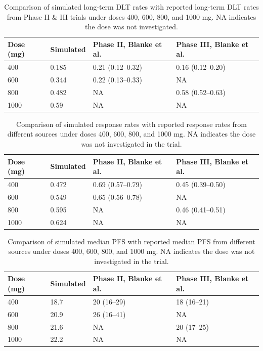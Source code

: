 \documentclass[11pt]{article}
\begin{document}
\begin{table}[htbp]
\centering
\caption{Comparison of simulated long-term DLT rates with reported long-term DLT rates from Phase II \& III trials under doses 400, 600, 800, and 1000 mg. NA indicates the dose was not investigated.}
\label{Imatinib_LT_DLT_comparison}
\begin{tabular}{llll}
\toprule
\textbf{Dose (mg)} & \textbf{Simulated} & \textbf{Phase II, Blanke et al.} & \textbf{Phase III, Blanke et al.} \\
\midrule
400  & 0.185 & 0.21 (0.12--0.32) & 0.16 (0.12--0.20) \\
600  & 0.344 & 0.22 (0.13--0.33) & NA \\
800  & 0.482 & NA & 0.58 (0.52--0.63) \\
1000 & 0.59  & NA & NA \\
\bottomrule
\end{tabular}
\end{table}

\begin{table}[htbp]
\centering
\caption{Comparison of simulated response rates with reported response rates from different sources under doses 400, 600, 800, and 1000 mg. NA indicates the dose was not investigated in the trial.}
\label{Imatinib_TRR_comparison}
\begin{tabular}{llll}
\toprule
\textbf{Dose (mg)} & \textbf{Simulated} & \textbf{Phase II, Blanke et al.} & \textbf{Phase III, Blanke et al.} \\
\midrule
400  & 0.472 & 0.69 (0.57--0.79) & 0.45 (0.39--0.50) \\
600  & 0.549 & 0.65 (0.56--0.78) & NA \\
800  & 0.595 & NA & 0.46 (0.41--0.51) \\
1000 & 0.624 & NA & NA \\
\bottomrule
\end{tabular}
\end{table}

\begin{table}[htbp]
\centering
\caption{Comparison of simulated median PFS with reported median PFS from different sources under doses 400, 600, 800, and 1000 mg. NA indicates the dose was not investigated in the trial.}
\label{Imatinib_PFS_comparison}
\begin{tabular}{llll}
\toprule
\textbf{Dose (mg)} & \textbf{Simulated} & \textbf{Phase II, Blanke et al.} & \textbf{Phase III, Blanke et al.} \\
\midrule
400  & 18.7 & 20 (16--29) & 18 (16--21) \\
600  & 20.9 & 26 (16--41) & NA \\
800  & 21.6 & NA & 20 (17--25) \\
1000 & 22.2 & NA & NA \\
\bottomrule
\end{tabular}
\end{table}
\end{document}
